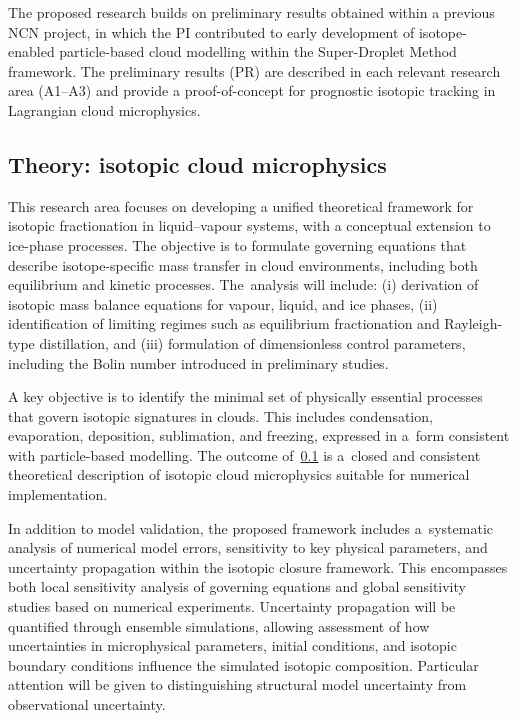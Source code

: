 \documentclass[12pt]{article}
\begin{document}
The proposed research builds on preliminary results obtained
within a previous NCN project, in which the PI contributed to early development
of isotope-enabled particle-based cloud modelling within the Super-Droplet Method framework.
The preliminary results (PR) are described in each relevant research area (A1--A3)
and provide a proof-of-concept for prognostic isotopic tracking in Lagrangian cloud microphysics.

\subsection{Theory: isotopic cloud microphysics}\label{A1}
This research area focuses on developing a unified theoretical framework for
isotopic fractionation in liquid–vapour systems,
with a conceptual extension to ice-phase processes.
The objective is to formulate governing equations that
describe isotope-specific mass transfer in
cloud environments, including both equilibrium and kinetic processes.
The~analysis will include:
(i) derivation of isotopic mass balance equations for vapour, liquid, and ice
phases,
(ii) identification of limiting regimes such as equilibrium fractionation and
Rayleigh-type distillation,
and (iii) formulation of dimensionless control parameters, including the Bolin
number introduced in preliminary studies.

A key objective is to identify the minimal set of physically
essential processes that govern isotopic signatures in clouds.
This includes condensation, evaporation, deposition, sublimation,
and freezing, expressed in a~form consistent with particle-based modelling.
The outcome of~\ref{A1} is a~closed and consistent theoretical description
of isotopic cloud microphysics suitable for numerical implementation.

In addition to model validation, the proposed framework includes
a~systematic analysis of numerical model errors,
sensitivity to key physical parameters,
and uncertainty propagation within the isotopic closure framework. 
This encompasses both local sensitivity analysis of governing 
equations and global sensitivity studies based on numerical experiments.
Uncertainty propagation will be quantified through ensemble simulations,
allowing assessment of how uncertainties in microphysical parameters,
initial conditions, and isotopic boundary conditions influence
the simulated isotopic composition.
Particular attention will be given to distinguishing
structural model uncertainty from observational uncertainty.
\end{document}
